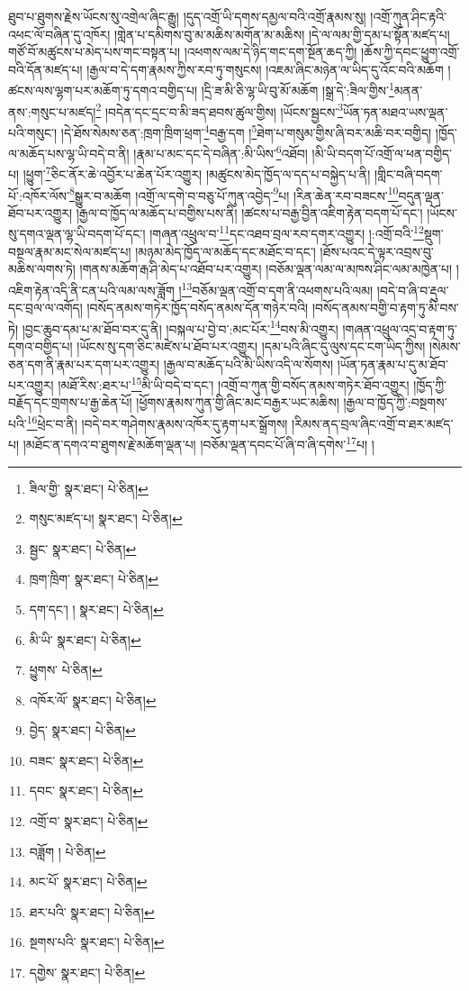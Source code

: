 ཐུབ་པ་ཐུགས་རྗེས་ཡོངས་སུ་འགྲེལ་ཞིང་རྒྱུ། །དུད་འགྲོ་ཡི་དགས་དམྱལ་བའི་འགྲོ་རྣམས་སུ། །འགྲོ་ཀུན་ཤིང་རྟའི་འཕང་ལོ་བཞིན་དུ་འཁོར། །གླེན་པ་དམིགས་བུ་མ་མཆིས་མགོན་མ་མཆིས། །དེ་ལ་ལམ་གྱི་དམ་པ་སྟོན་མཛད་པ། གཙོ་བོ་མཚུངས་པ་མེད་པས་གང་བསྟན་པ། །འཕགས་ལམ་དེ་ཉིད་གང་དག་སྔོན་ཆད་ཀྱི། །ཆོས་ཀྱི་དབང་ཕྱུག་འགྲོ་བའི་དོན་མཛད་པ། །རྒྱལ་བ་དེ་དག་རྣམས་ཀྱིས་རབ་ཏུ་གསུངས། །འཇམ་ཞིང་མཉེན་ལ་ཡིད་དུ་འོང་བའི་མཆོག །ཚངས་ལས་ལྷག་པར་མཆོག་ཏུ་དགའ་བགྱིད་པ། །དྲི་ཟ་མི་ཅི་ལྷ་ཡི་བུ་མོ་མཆོག །སྒྲ་དེ་:ཟིལ་གྱིས་\footnote{ཟིལ་གྱི་  སྣར་ཐང་།  པེ་ཅིན། }མནན་ནས་:གསུང་པ་མཛད།\footnote{གསུང་མཛད་པ།  སྣར་ཐང་།  པེ་ཅིན། } །བདེན་དང་དྲང་བ་མི་ཟད་ཐབས་ཚུལ་གྱིས། །ཡོངས་སྦྱངས་\footnote{སྦྱང་  སྣར་ཐང་།  པེ་ཅིན། }ཡོན་ཏན་མཐའ་ཡས་ལྡན་པའི་གསུང་། །དེ་ཐོས་སེམས་ཅན་:ཁྲག་ཁྲིག་ཕྲག་\footnote{ཁྲག་ཁྲིག་  སྣར་ཐང་།  པེ་ཅིན། }བརྒྱ་དག །\footnote{དག་དང་། །  སྣར་ཐང་།  པེ་ཅིན། }ཐེག་པ་གསུམ་གྱིས་ཞི་བར་མཆི་བར་བགྱིད། །ཁྱོད་ལ་མཆོད་པས་ལྷ་ཡི་བདེ་བ་ནི། །རྣམ་པ་མང་དང་དེ་བཞིན་:མི་ཡིས་\footnote{མི་ཡི་  སྣར་ཐང་།  པེ་ཅིན། }འཐོབ། །མི་ཡི་བདག་པོ་འགྲོ་ལ་ཕན་བགྱིད་པ། །ཕྱུག་\footnote{ཕྱུགས་  པེ་ཅིན། }ཅིང་ནོར་ཆེ་འབྱོར་པ་ཆེན་པོར་འགྱུར། །མཚུངས་མེད་ཁྱོད་ལ་དད་པ་བསྐྱེད་པ་ནི། །གླིང་བཞི་བདག་པོ་:འཁོར་ལོས་\footnote{འཁོར་ལོ་  སྣར་ཐང་།  པེ་ཅིན། }སྒྱུར་བ་མཆོག །འགྲོ་ལ་དགེ་བ་བཅུ་པོ་ཀུན་འབྱེད་\footnote{བྱེད་  སྣར་ཐང་།  པེ་ཅིན། }པ། །རིན་ཆེན་རབ་བཟངས་\footnote{བཟང་  སྣར་ཐང་།  པེ་ཅིན། }བདུན་ལྡན་ཐོབ་པར་འགྱུར། །རྒྱལ་བ་ཁྱོད་ལ་མཆོད་པ་བགྱིས་པས་ནི། །ཚངས་པ་བརྒྱ་བྱིན་འཇིག་རྟེན་བདག་པོ་དང་། །ཡོངས་སུ་དགའ་ལྡན་ལྷ་ཡི་བདག་པོ་དང་། །གཞན་འཕྲུལ་བ་\footnote{དབང་  སྣར་ཐང་།  པེ་ཅིན། }དང་འཐབ་བྲལ་རབ་དགར་འགྱུར། །:འགྲོ་བའི་\footnote{འགྲོ་བ་  སྣར་ཐང་།  པེ་ཅིན། }སྡུག་བསྔལ་རྣམ་མང་སེལ་མཛད་པ། །མཉམ་མེད་ཁྱོད་ལ་མཆོད་དང་མཐོང་བ་དང་། །ཐོས་པའང་དེ་ལྟར་འབྲས་བུ་མཆིས་ལགས་ཏེ། །གནས་མཆོག་རྒ་ཤི་མེད་པ་འཐོབ་པར་འགྱུར། །བཅོམ་ལྡན་ལམ་ལ་མཁས་ཤིང་ལམ་མཁྱེན་པ། །འཇིག་རྟེན་འདི་ནི་ངན་པའི་ལམ་ལས་ཟློག །\footnote{བཟློག །  པེ་ཅིན། }བཅོམ་ལྡན་འགྲོ་བ་དག་ནི་འཕགས་པའི་ལམ། །བདེ་བ་ཞི་བ་རྡུལ་དང་བྲལ་ལ་འགོད། །བསོད་ནམས་གཏེར་ཁྱོད་བསོད་ནམས་དོན་གཉེར་བའི། །བསོད་ནམས་བགྱི་བ་རྟག་ཏུ་མི་བས་ཏེ། །བྱང་ཆུབ་དམ་པ་མ་ཐོབ་བར་དུ་ནི། །བསྐལ་པ་བྱེ་བ་:མང་པོར་\footnote{མང་པོ་  སྣར་ཐང་།  པེ་ཅིན། }བས་མི་འགྱུར། །གཞན་འཕྲུལ་འདྲ་བ་རྟག་ཏུ་དགའ་བགྱིད་པ། །ཡོངས་སུ་དག་ཅིང་མཛེས་པ་ཐོབ་པར་འགྱུར། །དམ་པའི་ཞིང་དུ་ལུས་དང་ངག་ཡིད་ཀྱིས། །སེམས་ཅན་དག་ནི་རྣམ་པར་དག་པར་འགྱུར། །རྒྱལ་བ་མཆོད་པའི་མི་ཡིས་འདི་ལ་སོགས། །ཡོན་ཏན་རྣམ་པ་དུ་མ་ཐོབ་པར་འགྱུར། །མཐོ་རིས་:ཐར་པ་\footnote{ཐར་པའི་  སྣར་ཐང་།  པེ་ཅིན། }མི་ཡི་བདེ་བ་དང་། །འགྲོ་བ་ཀུན་གྱི་བསོད་ནམས་གཏེར་ཐོབ་འགྱུར། །ཁྱོད་ཀྱི་བརྗོད་དང་གྲགས་པ་རྒྱ་ཆེན་པོ། །ཕྱོགས་རྣམས་ཀུན་གྱི་ཞིང་མང་བརྒྱར་ཡང་མཆིས། །རྒྱལ་བ་ཁྱོད་ཀྱི་:བསྔགས་པའི་\footnote{སྔགས་པའི་  སྣར་ཐང་།  པེ་ཅིན། }ཕྲེང་བ་ནི། །བདེ་བར་གཤེགས་རྣམས་འཁོར་དུ་རྟག་པར་སྒྲོགས། །རིམས་ནད་བྲལ་ཞིང་འགྲོ་བ་ཐར་མཛད་པ། །མཐོང་ན་དགའ་བ་ཐུགས་རྗེ་མཆོག་ལྡན་པ། །བཅོམ་ལྡན་དབང་པོ་ཞི་བ་ཞི་དགེས་\footnote{དགྱེས་  སྣར་ཐང་།  པེ་ཅིན། }པ། །

